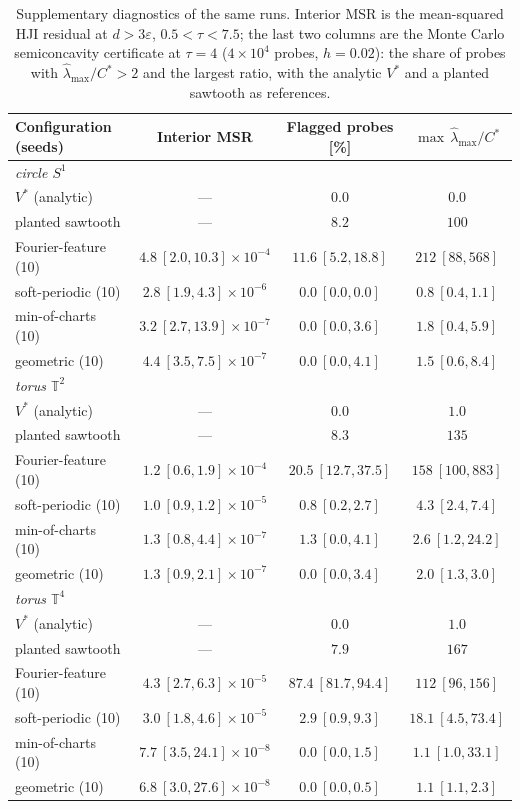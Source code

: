 \begin{table}[!tbp]
\centering
\scriptsize
\setlength{\tabcolsep}{4pt}
\begin{tabular}{lccc}
\toprule
Configuration (seeds) & Interior MSR & Flagged probes [\%] & $\max\,\hat\lambda_{\max}/C^{*}$ \\
\midrule
\multicolumn{4}{l}{\emph{circle $S^{1}$}} \\
$V^{*}$ (analytic) & --- & $0.0$ & $0.0$ \\
planted sawtooth & --- & $8.2$ & $100$ \\
Fourier-feature (10) & $4.8\ [2.0,10.3]\times10^{-4}$ & $11.6\ [5.2,18.8]$ & $212\ [88,568]$ \\
soft-periodic (10) & $2.8\ [1.9,4.3]\times10^{-6}$ & $0.0\ [0.0,0.0]$ & $0.8\ [0.4,1.1]$ \\
min-of-charts (10) & $3.2\ [2.7,13.9]\times10^{-7}$ & $0.0\ [0.0,3.6]$ & $1.8\ [0.4,5.9]$ \\
geometric (10) & $4.4\ [3.5,7.5]\times10^{-7}$ & $0.0\ [0.0,4.1]$ & $1.5\ [0.6,8.4]$ \\
\midrule
\multicolumn{4}{l}{\emph{torus $\mathbb{T}^{2}$}} \\
$V^{*}$ (analytic) & --- & $0.0$ & $1.0$ \\
planted sawtooth & --- & $8.3$ & $135$ \\
Fourier-feature (10) & $1.2\ [0.6,1.9]\times10^{-4}$ & $20.5\ [12.7,37.5]$ & $158\ [100,883]$ \\
soft-periodic (10) & $1.0\ [0.9,1.2]\times10^{-5}$ & $0.8\ [0.2,2.7]$ & $4.3\ [2.4,7.4]$ \\
min-of-charts (10) & $1.3\ [0.8,4.4]\times10^{-7}$ & $1.3\ [0.0,4.1]$ & $2.6\ [1.2,24.2]$ \\
geometric (10) & $1.3\ [0.9,2.1]\times10^{-7}$ & $0.0\ [0.0,3.4]$ & $2.0\ [1.3,3.0]$ \\
\midrule
\multicolumn{4}{l}{\emph{torus $\mathbb{T}^{4}$}} \\
$V^{*}$ (analytic) & --- & $0.0$ & $1.0$ \\
planted sawtooth & --- & $7.9$ & $167$ \\
Fourier-feature (10) & $4.3\ [2.7,6.3]\times10^{-5}$ & $87.4\ [81.7,94.4]$ & $112\ [96,156]$ \\
soft-periodic (10) & $3.0\ [1.8,4.6]\times10^{-5}$ & $2.9\ [0.9,9.3]$ & $18.1\ [4.5,73.4]$ \\
min-of-charts (10) & $7.7\ [3.5,24.1]\times10^{-8}$ & $0.0\ [0.0,1.5]$ & $1.1\ [1.0,33.1]$ \\
geometric (10) & $6.8\ [3.0,27.6]\times10^{-8}$ & $0.0\ [0.0,0.5]$ & $1.1\ [1.1,2.3]$ \\
\bottomrule
\end{tabular}
\caption{Supplementary diagnostics of the same runs.  Interior MSR is the
mean-squared HJI residual at $d > 3\varepsilon$, $0.5 < \tau < 7.5$; the last
two columns are the Monte Carlo semiconcavity certificate at $\tau = 4$
($4\times10^{4}$ probes, $h = 0.02$): the share of probes with
$\hat\lambda_{\max}/C^{*} > 2$ and the largest ratio, with the analytic
$V^{*}$ and a planted sawtooth as references.}
\label{tab:certificate}
\end{table}
